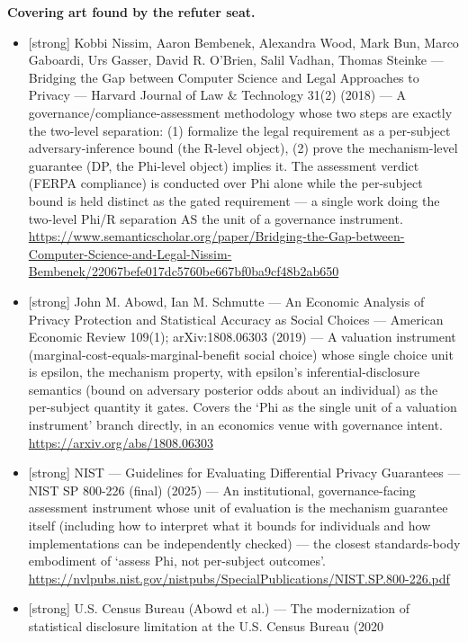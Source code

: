 \documentclass[
  11pt,
]{article}
\providecommand{\tightlist}{%
  \setlength{\itemsep}{0pt}\setlength{\parskip}{0pt}}
\begin{document}
\textbf{Covering art found by the refuter seat.}

\begin{itemize}
\tightlist
\item
  {[}strong{]} Kobbi Nissim, Aaron Bembenek, Alexandra Wood, Mark Bun,
  Marco Gaboardi, Urs Gasser, David R. O'Brien, Salil Vadhan, Thomas
  Steinke --- Bridging the Gap between Computer Science and Legal
  Approaches to Privacy --- Harvard Journal of Law \& Technology 31(2)
  (2018) --- A governance/compliance-assessment methodology whose two
  steps are exactly the two-level separation: (1) formalize the legal
  requirement as a per-subject adversary-inference bound (the R-level
  object), (2) prove the mechanism-level guarantee (DP, the Phi-level
  object) implies it. The assessment verdict (FERPA compliance) is
  conducted over Phi alone while the per-subject bound is held distinct
  as the gated requirement --- a single work doing the two-level Phi/R
  separation AS the unit of a governance instrument.
  \url{https://www.semanticscholar.org/paper/Bridging-the-Gap-between-Computer-Science-and-Legal-Nissim-Bembenek/22067befe017dc5760be667bf0ba9cf48b2ab650}
\item
  {[}strong{]} John M. Abowd, Ian M. Schmutte --- An Economic Analysis
  of Privacy Protection and Statistical Accuracy as Social Choices ---
  American Economic Review 109(1); arXiv:1808.06303 (2019) --- A
  valuation instrument (marginal-cost-equals-marginal-benefit social
  choice) whose single choice unit is epsilon, the mechanism property,
  with epsilon's inferential-disclosure semantics (bound on adversary
  posterior odds about an individual) as the per-subject quantity it
  gates. Covers the `Phi as the single unit of a valuation instrument'
  branch directly, in an economics venue with governance intent.
  \url{https://arxiv.org/abs/1808.06303}
\item
  {[}strong{]} NIST --- Guidelines for Evaluating Differential Privacy
  Guarantees --- NIST SP 800-226 (final) (2025) --- An institutional,
  governance-facing assessment instrument whose unit of evaluation is
  the mechanism guarantee itself (including how to interpret what it
  bounds for individuals and how implementations can be independently
  checked) --- the closest standards-body embodiment of `assess Phi, not
  per-subject outcomes'.
  \url{https://nvlpubs.nist.gov/nistpubs/SpecialPublications/NIST.SP.800-226.pdf}
\item
  {[}strong{]} U.S. Census Bureau (Abowd et al.) --- The modernization
  of statistical disclosure limitation at the U.S. Census Bureau (2020

\end{itemize}
\end{document}
